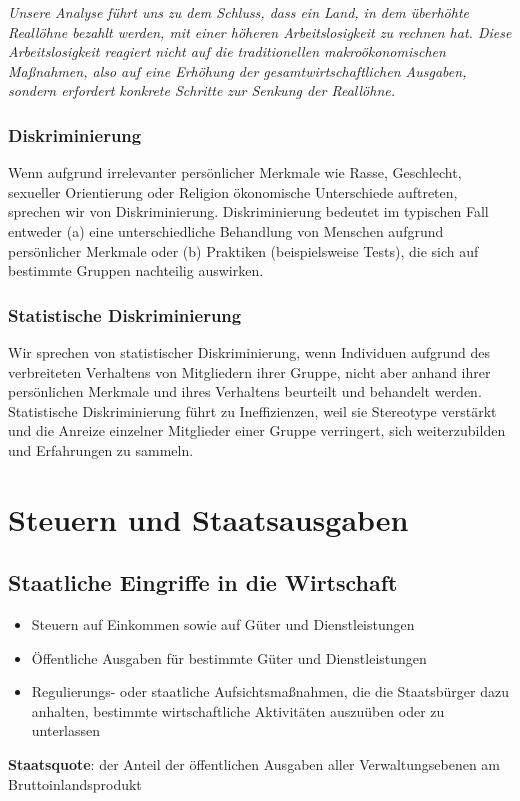 \documentclass[10pt]{scrartcl}
\begin{document}
{\it Unsere Analyse führt uns zu dem Schluss, dass ein Land, in dem überhöhte Reallöhne bezahlt werden, mit einer höheren Arbeitslosigkeit zu rechnen hat. Diese Arbeitslosigkeit reagiert nicht auf die traditionellen makroökonomischen Maßnahmen, also auf eine Erhöhung der gesamtwirtschaftlichen Ausgaben, sondern erfordert konkrete Schritte zur Senkung der Reallöhne.}


\subsubsection{Diskriminierung}
Wenn aufgrund irrelevanter persönlicher Merkmale wie Rasse, Geschlecht, sexueller Orientierung oder Religion ökonomische Unterschiede auftreten, sprechen wir von Diskriminierung. Diskriminierung bedeutet im typischen Fall entweder (a) eine unterschiedliche Behandlung von Menschen aufgrund persönlicher Merkmale oder (b) Praktiken (beispielsweise Tests), die sich auf bestimmte Gruppen nachteilig auswirken.

\subsubsection{Statistische Diskriminierung}
Wir sprechen von statistischer Diskriminierung, wenn Individuen aufgrund des verbreiteten Verhaltens von Mitgliedern ihrer Gruppe, nicht aber anhand ihrer persönlichen Merkmale und ihres Verhaltens beurteilt und behandelt werden.\\
Statistische Diskriminierung führt zu Ineffizienzen, weil sie Stereotype verstärkt und die Anreize einzelner Mitglieder einer Gruppe verringert, sich weiterzubilden und Erfahrungen zu sammeln.\\
\newpage
\section{Steuern und Staatsausgaben}
\subsection{Staatliche Eingriffe in die Wirtschaft}
\begin{itemize}
\item Steuern auf Einkommen sowie auf Güter und Dienstleistungen
\item Öffentliche Ausgaben für bestimmte Güter und Dienstleistungen
\item Regulierungs- oder staatliche Aufsichtsmaßnahmen, die die Staatsbürger dazu anhalten, bestimmte wirtschaftliche Aktivitäten auszuüben oder zu unterlassen \end{itemize}
{\bf Staatsquote}: der Anteil der öffentlichen Ausgaben aller Verwaltungsebenen am
Bruttoinlandsprodukt
\end{document}
